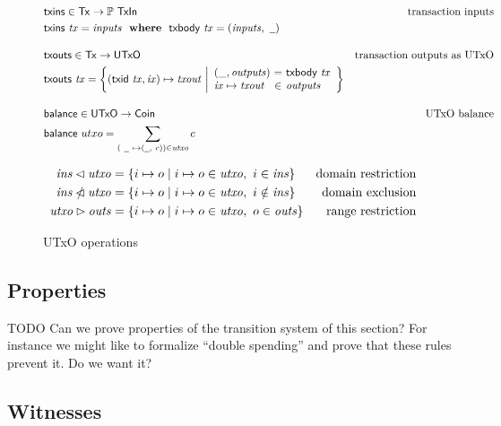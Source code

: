 \documentclass[11pt,a4paper]{article}
\newenvironment{todo}
  {\begin{bclogo}[logo=\bcoutil, couleur=red!5, couleurBarre=red, arrondi=0.2]{ TODO}}
  {\end{bclogo}}
\newcommand{\powerset}[1]{\mathbb{P}~#1}
\newcommand{\restrictdom}{\lhd}
\newcommand{\subtractdom}{\mathbin{\slashed{\restrictdom}}}
\newcommand{\restrictrange}{\rhd}
\newcommand{\var}[1]{\mathit{#1}}
\newcommand{\fun}[1]{\mathsf{#1}}
\newcommand{\type}[1]{\mathsf{#1}}
\newcommand{\nextdef}{\\[1em]}
\newcommand{\where}{~ ~ \mathbf{where}~ ~ }
\newcommand{\Tx}{\type{Tx}}
\newcommand{\UTxO}{\type{UTxO}}
\newcommand{\Coin}{\type{Coin}}
\newcommand{\TxIn}{\type{TxIn}}
\newcommand{\txins}[1]{\fun{txins}~ \var{#1}}
\newcommand{\txbody}[1]{\fun{txbody}~ \var{#1}}
\newcommand{\wcard}[0]{\underline{\phantom{a}}}
\begin{document}
\begin{figure}
  \begin{align*}
    & \fun{txins} \in \Tx \to \powerset{\TxIn}
    & \text{transaction inputs} \\
    & \txins{tx} = \var{inputs} \where \txbody{tx} = (\var{inputs}, ~\wcard)
    \nextdef
    & \fun{txouts} \in \Tx \to \UTxO
    & \text{transaction outputs as UTxO} \\
    & \fun{txouts} ~ \var{tx} =
      \left\{ (\fun{txid} ~ \var{tx}, \var{ix}) \mapsto \var{txout} ~
      \middle| \begin{array}{l@{~}c@{~}l}
                 (\_, \var{outputs}) & = & \txbody{tx} \\
                 \var{ix} \mapsto \var{txout} & \in & \var{outputs}
               \end{array}
      \right\}
    \nextdef
    & \fun{balance} \in \UTxO \to \Coin
    & \text{UTxO balance} \\
    & \fun{balance} ~ utxo = \sum_{(~\wcard ~ \mapsto (\wcard, ~c)) \in \var{utxo}} c
  \end{align*}

  \begin{align*}
    \var{ins} \restrictdom \var{utxo}
    & = \{ i \mapsto o \mid i \mapsto o \in \var{utxo}, ~ i \in \var{ins} \}
    & \text{domain restriction}
    \\
    \var{ins} \subtractdom \var{utxo}
    & = \{ i \mapsto o \mid i \mapsto o \in \var{utxo}, ~ i \notin \var{ins} \}
    & \text{domain exclusion}
    \\
    \var{utxo} \restrictrange \var{outs}
    & = \{ i \mapsto o \mid i \mapsto o \in \var{utxo}, ~ o \in \var{outs} \}
    & \text{range restriction}
  \end{align*}
  \caption{UTxO operations}
  \label{fig:utxo-auxiliary-ops}
\end{figure}

\subsection{Properties}
\label{sec:utxo-properties}


\begin{todo}
  Can we prove properties of the transition system of this section? For
  instance we might like to formalize ``double spending'' and prove that these
  rules prevent it. Do we want it?
\end{todo}

\subsection{Witnesses}
\label{sec:witnesses}
\end{document}
